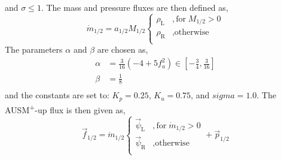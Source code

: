 and $\sigma \le 1$.
The mass and pressure fluxes are then defined as,
\begin{equation}
\dot{m}_{\text{1/2}} = a_{1/2} M_{\text{1/2}} \begin{cases}
\rho_{\text{L}} & , \text{for} \; M_{\text{1/2}} > 0 \\
\rho_{\text{R}} & ,\text{otherwise} \\
\end{cases}
\end{equation}
The parameters $\alpha$ and $\beta$ are chosen as,
\begin{align}
\alpha &= \frac{3}{16} \left( -4 + 5 f_{a}^2 \right) \in \left[ -\frac{3}{4}, \frac{3}{16} \right] \\
\beta &= \frac{1}{8} \\
\end{align}
and the constants are set to: $K_{p} = 0.25$, $K_{u} = 0.75$, and
$sigma = 1.0$.  The AUSM\textsuperscript{+}-up flux is then given as,
\begin{equation}
\vec{f}_{\text{1/2}} = \dot{m}_{\text{1/2}} \begin{cases}
\vec{\psi}_{\text{L}} & , \text{for} \; \dot{m}_{\text{1/2}} > 0 \\
\vec{\psi}_{\text{R}} & , \text{otherwise} \\
\end{cases}
+ \vec{p}_{\text{1/2}}
\end{equation}

